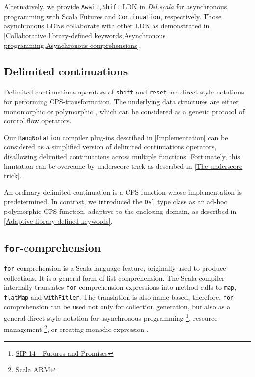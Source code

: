 Alternatively, we provide \lstinline{Await,Shift} LDK in \textit{Dsl.scala} for asynchronous programming with Scala Futures and \lstinline{Continuation}, respectively. Those asynchronous LDKs collaborate with other LDK as demonstrated in \cref{Collaborative library-defined keywords,Asynchronous programming,Asynchronous comprehensions}.

\subsection{Delimited continuations}

Delimited continuations operators of \lstinline{shift} and \lstinline{reset} \cite{Danvy1990AbstractingC} are direct style notations for performing CPS-transformation. The underlying data structures are either monomorphic \cite{danvy1989functional} or polymorphic \cite{asai2007polymorphic}, which can be considered as a generic protocol of control flow operators.

Our \lstinline{BangNotation} compiler plug-ins described in \cref{Implementation} can be considered as a simplified version of delimited continuations operators, disallowing delimited continuations across multiple functions. Fortunately, this limitation can be overcame by underscore trick as described in \cref{The underscore trick}.

An ordinary delimited continuation is a CPS function whose implementation is predetermined. In contrast, we introduced the \lstinline{Dsl} type class as an ad-hoc polymorphic CPS function, adaptive to the enclosing domain, as described in \cref{Adaptive library-defined keywords}.

\subsection{\lstinline{for}-comprehension}\label{for-comprehension}

\lstinline{for}-comprehension is a Scala language feature, originally used to produce collections. It is a general form of list comprehension. The Scala compiler internally translates \lstinline{for}-comprehension expressions into method calls to \lstinline{map}, \lstinline{flatMap} and \lstinline{withFitler}. The translation is also name-based, therefore, \lstinline{for}-comprehension can be used not only for collection generation, but also as a general direct style notation for asynchronous programming \footnote{\href{https://docs.scala-lang.org/sips/futures-promises.html}{SIP-14 - Futures and Promises}}, resource management \footnote{\href{http://jsuereth.com/scala-arm/}{Scala ARM}}, or creating monadic expression \cite{kenji2017scalaz,typelevel2017cats,twitter2016algebird}.

